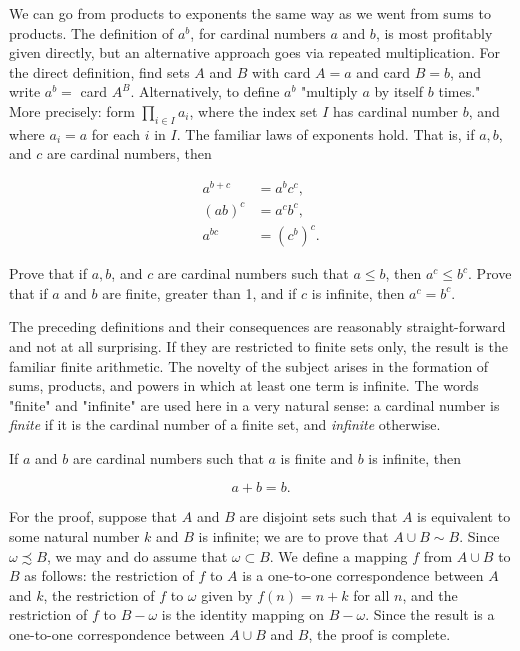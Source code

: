 We can go from products to exponents the same way as we went from sums to products. The definition of $a^{b}$, for cardinal numbers $a$ and $b$, is most profitably given directly, but an alternative approach goes via repeated multiplication. For the direct definition, find sets $A$ and $B$ with card $A = a$ and card $B = b$, and write $a^{b} =$ card $A^{B}$. Alternatively, to define $a^{b}$ "multiply $a$ by itself $b$ times." More precisely: form $\prod_{i \in I} a_{i}$, where the index set $I$ has cardinal number $b$, and where $a_{i} = a$ for each $i$ in $I$. The familiar laws of exponents hold. That is, if $a, b$, and $c$ are cardinal numbers, then 

\begin{align*}
a^{b+c} &= a^{b}c^{c}, \\
(ab)^{c} &= a^{c}b^{c}, \\
a^{bc} &= (c^{b})^{c}. 
\end{align*}

\begin{named}[EXERCISE. ] Prove that if $a, b$, and $c$ are cardinal numbers such that $a \le b$, then $a^{c} \le b^{c}$. Prove that if $a$ and $b$ are finite, greater than 1, and if $c$ is infinite, then $a^{c} = b^{c}$.
\end{named}

The preceding definitions and their consequences are reasonably straight-forward and not at all surprising. If they are restricted to finite sets only, the result is the familiar finite arithmetic. The novelty of the subject arises in the formation of sums, products, and powers in which at least one term is infinite. The words "finite" and "infinite" are used here in a very natural sense: a cardinal number is \textit{finite} if it is the cardinal number of a finite set, and \textit{infinite} otherwise. 

If $a$ and $b$ are cardinal numbers such that $a$ is finite and $b$ is infinite, then 

\begin{equation*}
a + b = b.
\end{equation*}

For the proof, suppose that $A$ and $B$ are disjoint sets such that $A$ is equivalent to some natural number $k$ and $B$ is infinite; we are to prove that $A \cup B \sim B$. Since $\omega \precsim B$, we may and do assume that $\omega \subset B$. We define a mapping $f$ from $A \cup B$ to $B$ as follows: the restriction of $f$ to $A$ is a one-to-one correspondence between $A$ and $k$, the restriction of $f$ to $\omega$ given by $f(n) = n + k$ for all $n$, and the restriction of $f$ to $B - \omega$ is the identity mapping on $B - \omega$. Since the result is a one-to-one correspondence between $A \cup B$ and $B$, the proof is complete. 

